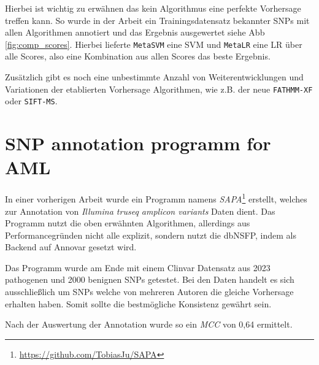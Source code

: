Hierbei ist wichtig zu erwähnen das kein Algorithmus eine perfekte Vorhersage treffen kann. So wurde in der Arbeit \cite{Liu.2016} ein Trainingsdatensatz bekannter SNPs mit allen Algorithmen annotiert und das Ergebnis ausgewertet siehe \ac{Abb} \ref{fig:comp_scores}. Hierbei lieferte \texttt{MetaSVM} eine \ac{SVM} und \texttt{MetaLR} eine \ac{LR} über alle Scores, also eine Kombination aus allen Scores das beste Ergebnis.


Zusätzlich gibt es noch eine unbestimmte Anzahl von Weiterentwicklungen und Variationen der etablierten Vorhersage Algorithmen, wie z.B. der neue \texttt{FATHMM-XF}\cite{Rogers.2017} oder \texttt{SIFT-MS}\cite{Smith.2015}.



\section{SNP annotation programm for AML}
\label{sec:sapa}
In einer vorherigen Arbeit wurde ein Programm namens \emph{SAPA}\footnote{\url{https://github.com/TobiasJu/SAPA}} erstellt, welches zur Annotation von \emph{Illumina truseq amplicon variants} Daten dient. Das Programm nutzt die oben erwähnten Algorithmen, allerdings aus Performancegründen nicht alle explizit, sondern nutzt die dbNSFP\cite{Liu.2016}, indem als Backend auf Annovar\cite{Wang.2010} gesetzt wird. 

Das Programm wurde am Ende mit einem Clinvar Datensatz aus 2023 pathogenen und 2000 benignen \ac{SNP}s getestet. Bei den Daten handelt es sich ausschließlich um \ac{SNP}s welche von mehreren Autoren die gleiche Vorhersage erhalten haben. Somit sollte die bestmögliche Konsistenz gewährt sein.

Nach der Auswertung der Annotation wurde so ein \emph{MCC} von 0,64 ermittelt.